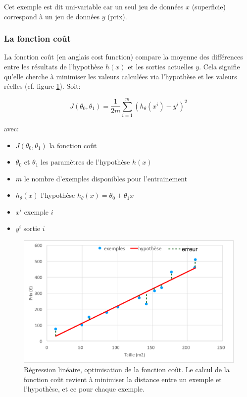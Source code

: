 Cet exemple est dit uni-variable car un seul jeu de données $x$ (superficie) correspond à un jeu de données $y$ (prix).


\subsubsection{La fonction coût}
La fonction coût (en anglais cost function) compare la moyenne des différences entre les résultats de l'hypothèse $h(x)$ et les sorties actuelles $y$. Cela signifie qu'elle cherche à minimiser les valeurs calculées via l'hypothèse et les valeurs réelles (cf. figure \ref{fig:Régression linéaire, optimisation de la fonction coût}). 
Soit: 

\begin{equation}
	J(\theta_0,\theta_1) = \frac{1}{2m}\sum_{i=1}^{m}(h_\theta(x^i)-y^i)^2
\end{equation}

avec:
\begin{itemize}
	\item $J(\theta_0,\theta_1)$ la fonction coût
	\item $\theta_0$ et $\theta_1$ les paramètres de l'hypothèse $h(x)$
	\item $m$ le nombre d'exemples disponibles pour l'entrainement 
	\item $h_\theta(x)$ l'hypothèse $h_\theta (x) = \theta_0 + \theta_1 x$
	\item $x^i$ exemple $i$
	\item $y^i$ sortie $i$
\end{itemize}

\begin{figure}[h]
	\centering\includegraphics[width=12cm]{images/cost.png}
	\caption[Régression linéaire, optimisation de la fonction coût]{Régression linéaire, optimisation de la fonction coût. Le calcul de la fonction coût revient à minimiser la distance entre un exemple et l'hypothèse, et ce pour chaque exemple.}
	\label{fig:Régression linéaire, optimisation de la fonction coût}
\end{figure}


